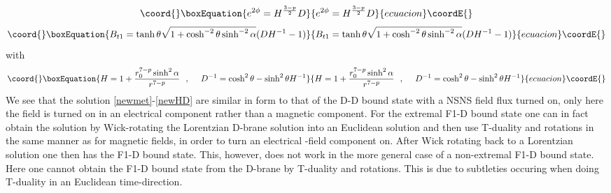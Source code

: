 \documentclass[a4paper,twoside,titlepage,12pt]{article}
\begin{document}
%
\begin{equation}\coord{}\boxEquation{
\label{newdil}
e^{2\phi} = H^{\frac{3-p}{2}} D
}{
e^{2\phi} = H^{\frac{3-p}{2}} D
}{ecuacion}\coordE{}\end{equation}
%
\begin{equation}\coord{}\boxEquation{
\label{newpot}
B_{t1} = \tanh \theta \sqrt{ 1 + \cosh^{-2} \theta \sinh^{-2} \alpha }
( D H^{-1} - 1 )
}{
B_{t1} = \tanh \theta \sqrt{ 1 + \cosh^{-2} \theta \sinh^{-2} \alpha }
( D H^{-1} - 1 )
}{ecuacion}\coordE{}\end{equation}
%
with
%
\begin{equation}\coord{}\boxEquation{
\label{newHD}
H = 1 + \frac{r_0^{7-p} \sinh^2 \alpha}{r^{7-p}} \spa
D^{-1} = \cosh^2 \theta - \sinh^2 \theta H^{-1}
}{
H = 1 + \frac{r_0^{7-p} \sinh^2 \alpha}{r^{7-p}} \spa
D^{-1} = \cosh^2 \theta - \sinh^2 \theta H^{-1}
}{ecuacion}\coordE{}\end{equation}
%
We see that the solution \eqref{newmet}-\eqref{newHD} are similar in form
to that of the D\coordHE{}-D\coordHE{} bound state with a NSNS \coordHE{} field flux 
turned on, only here the \coordHE{} field is turned on in an electrical
component rather than a magnetic component. 
For the extremal F1-D\coordHE{} bound state one can in fact obtain
the solution by Wick-rotating the Lorentzian D\coordHE{}-brane solution
into an Euclidean solution and then use T-duality and rotations
in the same manner as for magnetic \coordHE{} fields, in order to turn
an electrical \coordHE{}-field component on\cite{Maldacena:1999mh}. 
After Wick rotating back
to a Lorentzian solution one then has the F1-D\coordHE{} bound state.
This, however, does not work in the more general case of a non-extremal
F1-D\coordHE{} bound state. Here one cannot obtain the F1-D\coordHE{} bound state
from the D\coordHE{}-brane by T-duality and rotations.
This is due to subtleties occuring when doing T-duality in an Euclidean 
time-direction\cite{Hull:1998vg}.
\end{document}
